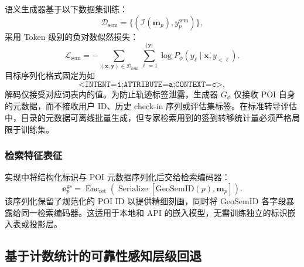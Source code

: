 \documentclass[10pt,fontset=none,twocolumn]{ctexart}
\newcommand{\gsid}{\mathrm{GeoSemID}}
\begin{document}
语义生成器基于以下数据集训练：
\begin{equation}
\mathcal{D}_{\mathrm{sem}} = \{ (\mathcal{I}(\bm{m}_p),y_p^{\mathrm{sem}}) \},
\label{eq:semantic_dataset}
\end{equation}
采用 Token 级别的负对数似然损失：
\begin{equation}
\mathcal{L}_{\mathrm{sem}}
=
-
\sum_{(\bm{x},\bm{y})\in\mathcal{D}_{\mathrm{sem}}}
\sum_{\ell=1}^{|\bm{y}|}
\log P_{\phi}(y_{\ell}\mid\bm{x},y_{<\ell}).
\label{eq:semantic_loss}
\end{equation}
目标序列化格式固定为如
\begin{equation}
\texttt{<INTENT=i;ATTRIBUTE=a;CONTEXT=c>},
\label{eq:serialization_example}
\end{equation}
解码仅接受对应词表内的值。为防止轨迹标签泄露，生成器 $G_{\phi}$ 仅接收 POI 自身的元数据，而不接收用户 ID、历史 check-in 序列或评估集标签。在标准转导评估中，目录的元数据可离线批量生成，但专家检索用到的签到转移统计量必须严格局限于训练集。

\subsubsection{检索特征表征}

实现中将结构化标识与 POI 元数据序列化后交给检索编码器：
\begin{equation}
\bm{e}_{p}^{\mathrm{gs}}
=
\operatorname{Enc}_{\mathrm{ret}}
\left(
\operatorname{Serialize}
\left[
\gsid(p),\bm{m}_p
\right]
\right).
\label{eq:geosemid_embedding}
\end{equation}
该序列化保留了规范化的 POI ID 以提供精细刻画，同时将 GeoSemID 各字段暴露给同一检索编码器。这适用于本地和 API 的嵌入模型，无需训练独立的标识嵌入表或投影层。

\subsection{基于计数统计的可靠性感知层级回退}
\label{subsec:backoff}
\end{document}
